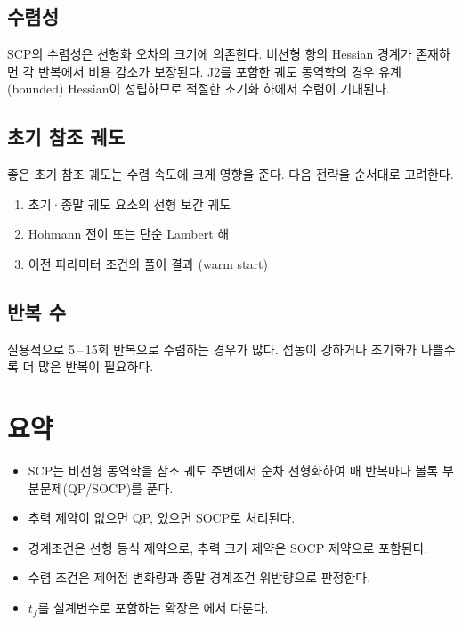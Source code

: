 \documentclass[11pt]{article}
\begin{document}
\subsection{수렴성}

SCP의 수렴성은 선형화 오차의 크기에 의존한다.
비선형 항의 Hessian 경계가 존재하면 각 반복에서 비용 감소가 보장된다.
J2를 포함한 궤도 동역학의 경우 유계(bounded) Hessian이 성립하므로
적절한 초기화 하에서 수렴이 기대된다.

\subsection{초기 참조 궤도}

좋은 초기 참조 궤도는 수렴 속도에 크게 영향을 준다.
다음 전략을 순서대로 고려한다.

\begin{enumerate}
  \item 초기·종말 궤도 요소의 선형 보간 궤도
  \item Hohmann 전이 또는 단순 Lambert 해
  \item 이전 파라미터 조건의 풀이 결과 (warm start)
\end{enumerate}

\subsection{반복 수}

실용적으로 5\,--\,15회 반복으로 수렴하는 경우가 많다.
섭동이 강하거나 초기화가 나쁠수록 더 많은 반복이 필요하다.

\section{요약}

\begin{itemize}
  \item SCP는 비선형 동역학을 참조 궤도 주변에서 순차 선형화하여
        매 반복마다 볼록 부분문제(QP/SOCP)를 푼다.
  \item 추력 제약이 없으면 QP, 있으면 SOCP로 처리된다.
  \item 경계조건은 선형 등식 제약으로, 추력 크기 제약은 SOCP 제약으로 포함된다.
  \item 수렴 조건은 제어점 변화량과 종말 경계조건 위반량으로 판정한다.
  \item $t_f$를 설계변수로 포함하는 확장은 \cite{report007}에서 다룬다.
\end{itemize}



\end{document}

